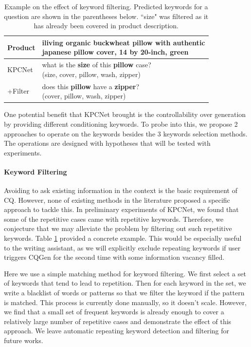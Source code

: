 \begin{table}
  \small
  \centering
\begin{tabular}{l|l}
\hline
Product & \makecell[l]{iliving organic buckwheat pillow with authentic \\ japanese pillow cover, 14 by 20-inch, green } \\
\hline
KPCNet & \makecell[l]{what is the \textbf{size} of this \textbf{pillow} case? \\ (size, cover, pillow, wash, zipper)} \\
+Filter        & \makecell[l]{does this \textbf{pillow} have a \textbf{zipper}? \\ (cover, pillow, wash, zipper)} \\

\hline
\end{tabular}
\caption{\label{tab:kwd-filter} Example on the effect of keyword filtering. Predicted keywords for a question are shown in the parentheses below. ``size" was filtered as it has already been covered in product description.}
\end{table}

One potential benefit that KPCNet brought is the controllability over generation by providing different conditioning keywords. To probe into this, we propose 2 approaches to operate on the keywords besides the 3 keywords selection methods. The operations are designed with hypotheses that will be tested with experiments.

\paragraph{Keyword Filtering} \label{para:filter} Avoiding to ask existing information in the context is the basic requirement of CQ. However, none of existing methods in the literature proposed a specific approach to tackle this. In preliminary experiments of KPCNet, we found that some of the repetitive cases came with repetitive keywords. Therefore, we conjecture that we may alleviate the problem by filtering out such repetitive keywords. Table \ref{tab:kwd-filter} provided a concrete example. This would be especially useful to the writing assistant, as we will explicitly exclude repeating keywords if user triggers CQGen for the second time with some information vacancy filled.

Here we use a simple matching method for keyword filtering. We first select a set of keywords that tend to lead to repetition. Then for each keyword in the set, we write a blacklist of words or patterns so that we filter the keyword if the pattern is matched. This process is currently done manually, so it doesn't scale. However, we find that a small set of frequent keywords is already enough to cover a relatively large number of repetitive cases and demonstrate the effect of this approach. We leave automatic repeating keyword detection and filtering for future works.  

